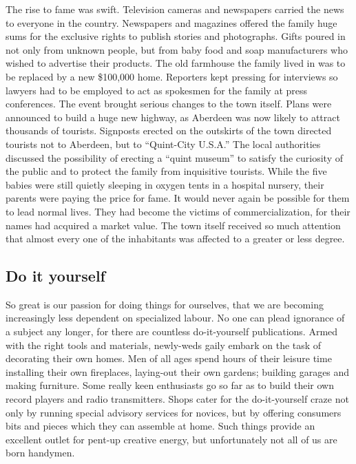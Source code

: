 \documentclass[11pt]{article}
\begin{document}
The rise to fame was swift. Television cameras and newspapers carried the news to everyone in the country. Newspapers and magazines offered the family huge sums for the exclusive rights to publish stories and photographs. Gifts poured in not only from unknown people, but from baby food and soap manufacturers who wished to advertise their products. The old farmhouse the family lived in was to be replaced by a new \$100,000 home. Reporters kept pressing for interviews so lawyers had to be employed to act as spokesmen for the family at press conferences. The event brought serious changes to the town itself. Plans were announced to build a huge new highway, as Aberdeen was now likely to attract thousands of tourists. Signposts erected on the outskirts of the town directed tourists not to Aberdeen, but to ``Quint-City U.S.A.'' The local authorities discussed the possibility of erecting a ``quint museum'' to satisfy the curiosity of the public and to protect the family from inquisitive tourists. While the five babies were still quietly sleeping in oxygen tents in a hospital nursery, their parents were paying the price for fame. It would never again be possible for them to lead normal lives. They had become the victims of commercialization, for their names had acquired a market value. The town itself received so much attention that almost every one of the inhabitants was affected to a greater or less degree.
\subsection{Do it yourself}
\label{sec-1-46}

So great is our passion for doing things for ourselves, that we are becoming increasingly less dependent on specialized labour. No one can plead ignorance of a subject any longer, for there are countless do-it-yourself publications. Armed with the right tools and materials, newly-weds gaily embark on the task of decorating their own homes. Men of all ages spend hours of their leisure time installing their own fireplaces, laying-out their own gardens; building garages and making furniture. Some really keen enthusiasts go so far as to build their own record players and radio transmitters. Shops cater for the do-it-yourself craze not only by running special advisory services for novices, but by offering consumers bits and pieces which they can assemble at home. Such things provide an excellent outlet for pent-up creative energy, but unfortunately not all of us are born handymen. 
\end{document}
